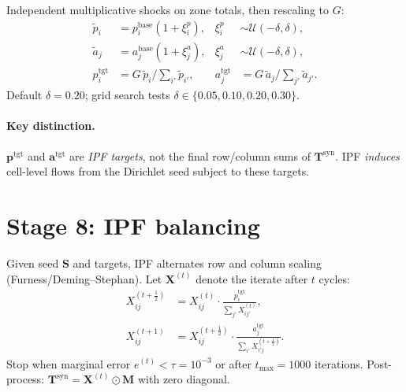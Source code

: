 \documentclass[11pt,a4paper]{report}
\newcommand{\Tsyn}{\mathbf{T}^{\mathrm{syn}}}
\newcommand{\Xipf}[1]{\mathbf{X}^{(#1)}}
\newcommand{\mathbfp}{\mathbf{p}}
\newcommand{\mathbfa}{\mathbf{a}}
\newcommand{\mathbfS}{\mathbf{S}}
\newcommand{\mathbfM}{\mathbf{M}}
\begin{document}
Independent multiplicative shocks on zone totals, then rescaling to $G$:
\begin{align}
    \tilde{p}_i &= p_i^{\mathrm{base}}(1+\xi_i^p), & \xi_i^p &\sim \mathcal{U}(-\delta,\delta), \\
    \tilde{a}_j &= a_j^{\mathrm{base}}(1+\xi_j^a), & \xi_j^a &\sim \mathcal{U}(-\delta,\delta), \\
    p_i^{\mathrm{tgt}} &= G\,\tilde{p}_i \Big/ {\textstyle\sum_{i'}\tilde{p}_{i'}}, &
    a_j^{\mathrm{tgt}} &= G\,\tilde{a}_j \Big/ {\textstyle\sum_{j'}\tilde{a}_{j'}}.
\end{align}
Default $\delta=0.20$; grid search tests $\delta\in\{0.05,0.10,0.20,0.30\}$.

\paragraph{Key distinction.}
$\mathbfp^{\mathrm{tgt}}$ and $\mathbfa^{\mathrm{tgt}}$ are \emph{IPF targets}, not the final row/column sums of $\Tsyn$. IPF \emph{induces} cell-level flows from the Dirichlet seed subject to these targets.

\section{Stage 8: IPF balancing}

Given seed $\mathbfS$ and targets, IPF alternates row and column scaling (Furness/Deming--Stephan). Let $\Xipf{t}$ denote the iterate after $t$ cycles:
\begin{align}
    X^{(t+\frac{1}{2})}_{ij} &= X^{(t)}_{ij}\cdot \frac{p_i^{\mathrm{tgt}}}{\sum_{j'}X^{(t)}_{ij'}}, \\
    X^{(t+1)}_{ij} &= X^{(t+\frac{1}{2})}_{ij}\cdot \frac{a_j^{\mathrm{tgt}}}{\sum_{i'}X^{(t+\frac{1}{2})}_{i'j}}.
\end{align}
Stop when marginal error $e^{(t)}<\tau=10^{-3}$ or after $t_{\max}=1000$ iterations. Post-process: $\Tsyn=\Xipf{t}\odot\mathbfM$ with zero diagonal.
\end{document}
